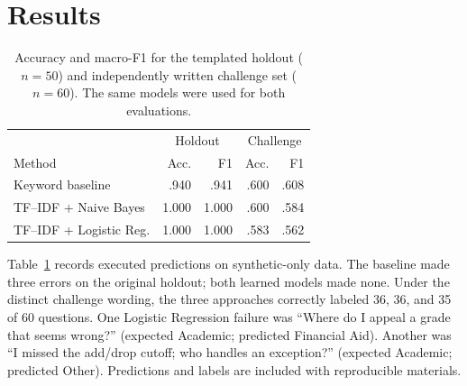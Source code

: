 \documentclass[sigconf,anonymous]{acmart}
\begin{document}
\section{Results}
\begin{table}[t]
\centering
\caption{Accuracy and macro-F1 for the templated holdout ($n=50$) and independently written challenge set ($n=60$). The same models were used for both evaluations.}
\label{tab:results}
\begin{tabular}{lrrrr}
\toprule
& \multicolumn{2}{c}{Holdout} & \multicolumn{2}{c}{Challenge} \\
Method & Acc. & F1 & Acc. & F1 \\
\midrule
Keyword baseline & .940 & .941 & .600 & .608 \\
TF--IDF + Naive Bayes & 1.000 & 1.000 & .600 & .584 \\
TF--IDF + Logistic Reg. & 1.000 & 1.000 & .583 & .562 \\
\bottomrule
\end{tabular}
\end{table}
Table~\ref{tab:results} records executed predictions on synthetic-only data. The baseline made three errors on the original holdout; both learned models made none. Under the distinct challenge wording, the three approaches correctly labeled 36, 36, and 35 of 60 questions. One Logistic Regression failure was ``Where do I appeal a grade that seems wrong?'' (expected Academic; predicted Financial Aid). Another was ``I missed the add/drop cutoff; who handles an exception?'' (expected Academic; predicted Other). Predictions and labels are included with reproducible materials.
\end{document}
